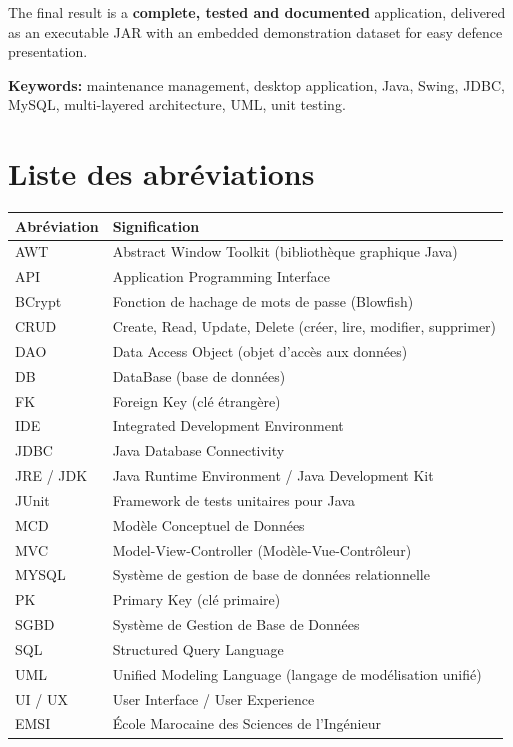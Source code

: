 \documentclass[11pt,a4paper]{report}
\begin{document}
The final result is a \textbf{complete, tested and documented} application, delivered as an executable JAR with an embedded demonstration dataset for easy defence presentation.

\textbf{Keywords:} maintenance management, desktop application, Java, Swing, JDBC, MySQL, multi-layered architecture, UML, unit testing.
\renewcommand{\contentsname}{Sommaire}
\tableofcontents
\renewcommand{\listfigurename}{Liste des figures}
\listoffigures
\renewcommand{\listtablename}{Liste des tableaux}
\listoftables
{}
\chapter*{Liste des abréviations}
\begin{table}[htbp]\centering\small
\begin{tabularx}{\textwidth}{|p{3.5cm}|X|}
\hline\rowcolor{hdr}\textbf{Abréviation} & \textbf{Signification}\\ \hline
AWT & Abstract Window Toolkit (bibliothèque graphique Java)\\ \hline
API & Application Programming Interface\\ \hline
BCrypt & Fonction de hachage de mots de passe (Blowfish)\\ \hline
CRUD & Create, Read, Update, Delete (créer, lire, modifier, supprimer)\\ \hline
DAO & Data Access Object (objet d'accès aux données)\\ \hline
DB & DataBase (base de données)\\ \hline
FK & Foreign Key (clé étrangère)\\ \hline
IDE & Integrated Development Environment\\ \hline
JDBC & Java Database Connectivity\\ \hline
JRE / JDK & Java Runtime Environment / Java Development Kit\\ \hline
JUnit & Framework de tests unitaires pour Java\\ \hline
MCD & Modèle Conceptuel de Données\\ \hline
MVC & Model-View-Controller (Modèle-Vue-Contrôleur)\\ \hline
MYSQL & Système de gestion de base de données relationnelle\\ \hline
PK & Primary Key (clé primaire)\\ \hline
SGBD & Système de Gestion de Base de Données\\ \hline
SQL & Structured Query Language\\ \hline
UML & Unified Modeling Language (langage de modélisation unifié)\\ \hline
UI / UX & User Interface / User Experience\\ \hline
EMSI & École Marocaine des Sciences de l'Ingénieur\\ \hline
\end{tabularx}
\end{table}
\end{document}

